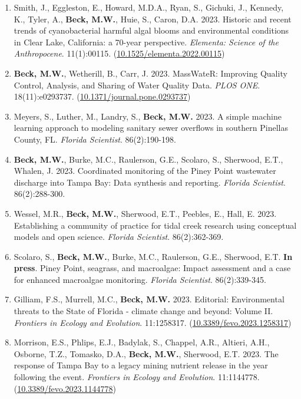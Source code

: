 \documentclass[letterpaper,12pt]{article}
\begin{document}
\begin{enumerate}
\item Smith, J., Eggleston, E., Howard, M.D.A., Ryan, S., Gichuki, J., Kennedy, K., Tyler, A., \textbf{Beck, M.W.}, Huie, S., Caron, D.A. 2023. Historic and recent trends of cyanobacterial harmful algal blooms and environmental conditions in Clear Lake, California: a 70-year perspective. \textit{Elementa: Science of the Anthropocene}. 11(1):00115. ({\footnotesize\href{https://doi.org/10.1525/elementa.2022.00115}{10.1525/elementa.2022.00115}})

\item \textbf{Beck, M.W.}, Wetherill, B., Carr, J. 2023. MassWateR: Improving Quality Control, Analysis, and Sharing of Water Quality Data. \textit{PLOS ONE}. 18(11):e0293737. ({\footnotesize\href{https://doi.org/10.1371/journal.pone.0293737}{10.1371/journal.pone.0293737}})

\item Meyers, S., Luther, M., Landry, S., \textbf{Beck, M.W.} 2023. A simple machine learning approach to modeling sanitary sewer overflows in southern Pinellas County, FL. \textit{Florida Scientist}. 86(2):190-198.

\item \textbf{Beck, M.W.}, Burke, M.C., Raulerson, G.E., Scolaro, S., Sherwood, E.T., Whalen, J. 2023. Coordinated monitoring of the Piney Point wastewater discharge into Tampa Bay: Data synthesis and reporting. \textit{Florida Scientist}. 86(2):288-300.

\item Wessel, M.R., \textbf{Beck, M.W.}, Sherwood, E.T., Peebles, E., Hall, E. 2023. Establishing a community of practice for tidal creek research using conceptual models and open science. \textit{Florida Scientist}. 86(2):362-369. 

\item Scolaro, S., \textbf{Beck, M.W.}, Burke, M.C., Raulerson, G.E., Sherwood, E.T. \textbf{In press}. Piney Point, seagrass, and macroalgae: Impact assessment and a case for enhanced macroalgae monitoring. \textit{Florida Scientist}. 86(2):339-345.

\item Gilliam, F.S., Murrell, M.C., \textbf{Beck, M.W.} 2023. Editorial: Environmental threats to the State of Florida - climate change and beyond: Volume II. \textit{Frontiers in Ecology and Evolution}. 11:1258317. ({\footnotesize\href{https://doi.org/10.3389/fevo.2023.1258317}{10.3389/fevo.2023.1258317}})

\item Morrison, E.S., Phlips, E.J., Badylak, S., Chappel, A.R., Altieri, A.H., Osborne, T.Z., Tomasko, D.A., \textbf{Beck, M.W.}, Sherwood, E.T. 2023. The response of Tampa Bay to a legacy mining nutrient release in the year following the event. \textit{Frontiers in Ecology and Evolution}. 11:1144778. ({\footnotesize\href{https://doi.org/10.3389/fevo.2023.1144778}{10.3389/fevo.2023.1144778}})


\end{enumerate}
\end{document}
